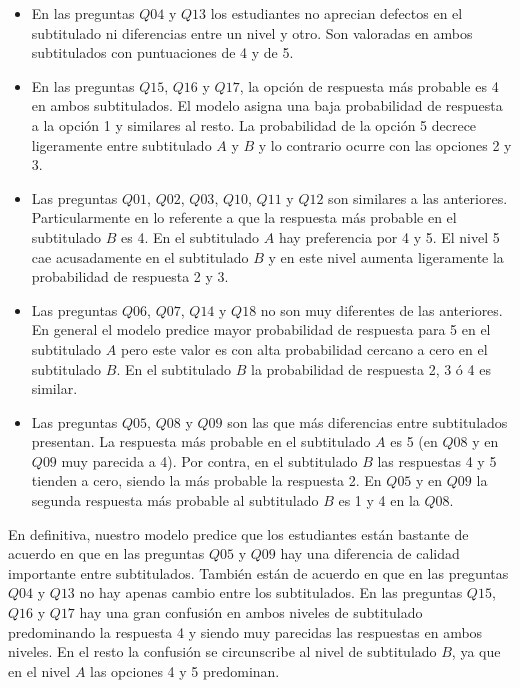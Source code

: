 \documentclass[
  12pt,
  a4paper,
  extrafontsizes,
  onecolumn,
  openright,
  table]{memoir}
\begin{document}
\begin{itemize}
\item
  En las preguntas \(Q04\) y \(Q13\) los estudiantes no aprecian
  defectos en el subtitulado ni diferencias entre un nivel y otro. Son
  valoradas en ambos subtitulados con puntuaciones de 4 y de 5.
\item
  En las preguntas \(Q15\), \(Q16\) y \(Q17\), la opción de respuesta
  más probable es 4 en ambos subtitulados. El modelo asigna una baja
  probabilidad de respuesta a la opción 1 y similares al resto. La
  probabilidad de la opción 5 decrece ligeramente entre subtitulado
  \(A\) y \(B\) y lo contrario ocurre con las opciones 2 y 3.
\item
  Las preguntas \(Q01\), \(Q02\), \(Q03\), \(Q10\), \(Q11\) y \(Q12\)
  son similares a las anteriores. Particularmente en lo referente a que
  la respuesta más probable en el subtitulado \(B\) es 4. En el
  subtitulado \(A\) hay preferencia por 4 y 5. El nivel 5 cae
  acusadamente en el subtitulado \(B\) y en este nivel aumenta
  ligeramente la probabilidad de respuesta 2 y 3.
\item
  Las preguntas \(Q06\), \(Q07\), \(Q14\) y \(Q18\) no son muy
  diferentes de las anteriores. En general el modelo predice mayor
  probabilidad de respuesta para 5 en el subtitulado \(A\) pero este
  valor es con alta probabilidad cercano a cero en el subtitulado \(B\).
  En el subtitulado \(B\) la probabilidad de respuesta 2, 3 ó 4 es
  similar.
\item
  Las preguntas \(Q05\), \(Q08\) y \(Q09\) son las que más diferencias
  entre subtitulados presentan. La respuesta más probable en el
  subtitulado \(A\) es 5 (en \(Q08\) y en \(Q09\) muy parecida a 4). Por
  contra, en el subtitulado \(B\) las respuestas 4 y 5 tienden a cero,
  siendo la más probable la respuesta 2. En \(Q05\) y en \(Q09\) la
  segunda respuesta más probable al subtitulado \(B\) es 1 y 4 en la
  \(Q08\).
\end{itemize}

En definitiva, nuestro modelo predice que los estudiantes están bastante
de acuerdo en que en las preguntas \(Q05\) y \(Q09\) hay una diferencia
de calidad importante entre subtitulados. También están de acuerdo en
que en las preguntas \(Q04\) y \(Q13\) no hay apenas cambio entre los
subtitulados. En las preguntas \(Q15\), \(Q16\) y \(Q17\) hay una gran
confusión en ambos niveles de subtitulado predominando la respuesta 4 y
siendo muy parecidas las respuestas en ambos niveles. En el resto la
confusión se circunscribe al nivel de subtitulado \(B\), ya que en el
nivel \(A\) las opciones 4 y 5 predominan.
\end{document}
